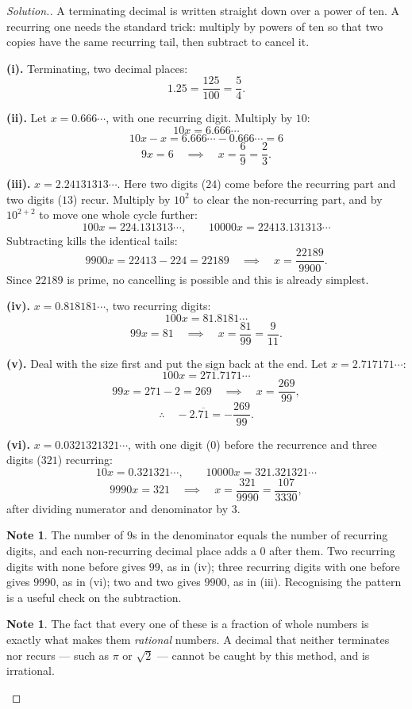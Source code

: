 \documentclass[11pt,a4paper]{article}
\theoremstyle{definition}
\newtheorem{note}[thm]{Note}
\newenvironment{solution}
  {\renewcommand{\qedsymbol}{}\begin{proof}[\textit{Solution}.]}
  {\end{proof}}
\begin{document}
\begin{solution}
A terminating decimal is written straight down over a power of ten. A recurring one needs
the standard trick: multiply by powers of ten so that two copies have the same recurring
tail, then subtract to cancel it.

\textbf{(i).} Terminating, two decimal places:
$$1.25=\frac{125}{100}=\frac{5}{4}.$$

\textbf{(ii).} Let $x=0.666\cdots$, with one recurring digit. Multiply by $10$:
$$10x=6.666\cdots$$
$$10x-x=6.666\cdots-0.666\cdots=6$$
$$9x=6\quad\implies\quad x=\frac{6}{9}=\frac{2}{3}.$$

\textbf{(iii).} $x=2.24131313\cdots$. Here two digits ($24$) come before the recurring
part and two digits ($13$) recur. Multiply by $10^2$ to clear the non-recurring part, and
by $10^{2+2}$ to move one whole cycle further:
$$100x=224.131313\cdots,\qquad 10000x=22413.131313\cdots$$
Subtracting kills the identical tails:
$$9900x=22413-224=22189\quad\implies\quad x=\frac{22189}{9900}.$$
Since $22189$ is prime, no cancelling is possible and this is already simplest.

\textbf{(iv).} $x=0.818181\cdots$, two recurring digits:
$$100x=81.8181\cdots$$
$$99x=81\quad\implies\quad x=\frac{81}{99}=\frac{9}{11}.$$

\textbf{(v).} Deal with the size first and put the sign back at the end. Let
$x=2.717171\cdots$:
$$100x=271.7171\cdots$$
$$99x=271-2=269\quad\implies\quad x=\frac{269}{99},$$
$$\therefore\quad -2.\overline{71}=-\frac{269}{99}.$$

\textbf{(vi).} $x=0.0321321321\cdots$, with one digit ($0$) before the recurrence and
three digits ($321$) recurring:
$$10x=0.321321\cdots,\qquad 10000x=321.321321\cdots$$
$$9990x=321\quad\implies\quad x=\frac{321}{9990}=\frac{107}{3330},$$
after dividing numerator and denominator by $3$.

\begin{note}
The number of $9$s in the denominator equals the number of recurring digits, and each
non-recurring decimal place adds a $0$ after them. Two recurring digits with none before
gives $99$, as in (iv); three recurring digits with one before gives $9990$, as in (vi);
two and two gives $9900$, as in (iii). Recognising the pattern is a useful check on the
subtraction.
\end{note}

\begin{note}
The fact that every one of these is a fraction of whole numbers is exactly what makes
them \emph{rational} numbers. A decimal that neither terminates nor recurs --- such as
$\pi$ or $\sqrt{2}$ --- cannot be caught by this method, and is irrational.
\end{note}
\end{solution}
\end{document}
